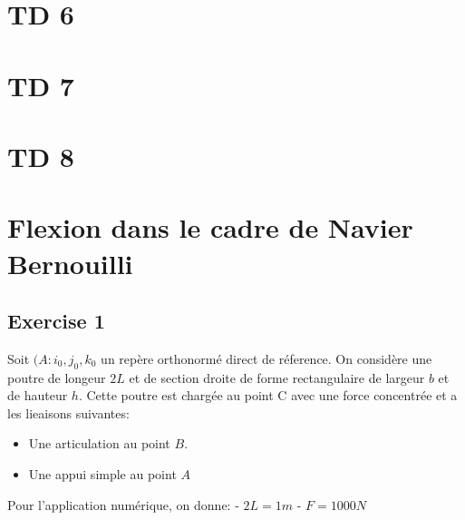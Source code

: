 \documentclass[
]{book}
\providecommand{\tightlist}{%
  \setlength{\itemsep}{0pt}\setlength{\parskip}{0pt}}
\begin{document}
\hypertarget{td-6}{%
\chapter{TD 6}\label{td-6}}

\hypertarget{td-7}{%
\chapter{TD 7}\label{td-7}}

\hypertarget{td-8}{%
\chapter{TD 8}\label{td-8}}

\hypertarget{flexion-dans-le-cadre-de-navier-bernouilli}{%
\chapter{Flexion dans le cadre de Navier Bernouilli}\label{flexion-dans-le-cadre-de-navier-bernouilli}}

\hypertarget{exercise-1-1}{%
\section{Exercise 1}\label{exercise-1-1}}

Soit \((A: i_{0}, j_{0}, k_{0}\) un repère orthonormé direct de réference.
On considère une poutre de longeur \(2L\) et de section droite de forme rectangulaire de largeur \(b\) et de hauteur \(h\).
Cette poutre est chargée au point C avec une force concentrée et a les lieaisons suivantes:

\begin{itemize}
\tightlist
\item
  Une articulation au point \(B\).
\item
  Une appui simple au point \(A\)
\end{itemize}

Pour l'application numérique, on donne:
- \(2L = 1m\)
- \(F=1000 N\)

  
\end{document}
